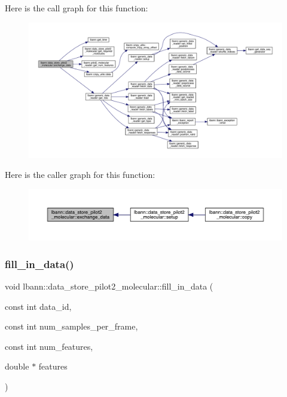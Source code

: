 Here is the call graph for this function\+:\nopagebreak
\begin{figure}[H]
\begin{center}
\leavevmode
\includegraphics[width=350pt]{classlbann_1_1data__store__pilot2__molecular_addaa6db4e1b3a25424da9da63c0b3616_cgraph}
\end{center}
\end{figure}
Here is the caller graph for this function\+:\nopagebreak
\begin{figure}[H]
\begin{center}
\leavevmode
\includegraphics[width=350pt]{classlbann_1_1data__store__pilot2__molecular_addaa6db4e1b3a25424da9da63c0b3616_icgraph}
\end{center}
\end{figure}
\mbox{\label{classlbann_1_1data__store__pilot2__molecular_a0157fe4d04961c03c0d983cb43aa1cec}} 
\subsubsection{\texorpdfstring{fill\+\_\+in\+\_\+data()}{fill\_in\_data()}}
{\footnotesize\ttfamily void lbann\+::data\+\_\+store\+\_\+pilot2\+\_\+molecular\+::fill\+\_\+in\+\_\+data (\begin{DoxyParamCaption}\item[{const int}]{data\+\_\+id,  }\item[{const int}]{num\+\_\+samples\+\_\+per\+\_\+frame,  }\item[{const int}]{num\+\_\+features,  }\item[{double $\ast$}]{features }\end{DoxyParamCaption})\hspace{0.3cm}{\ttfamily [protected]}}



